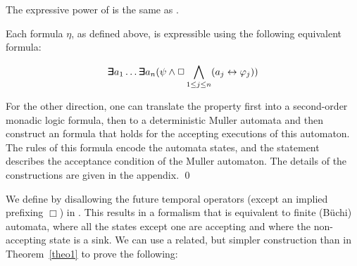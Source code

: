 \begin{theorem}
\label{theo1}
The expressive power of 
\ELTL{} is the same as \QLTL{}.
\end{theorem}
Each \ELTL{} formula $\eta$, as defined above,
is expressible using the following equivalent \QLTL{} formula:

\[   \bm{\exists}\kern-0.6em\bm{\exists} a_1 \ldots \bm{\exists}\kern-0.6em\bm{\exists} a_n  ( \psi  \wedge   \Box \bigwedge_{1 \leq j \leq n} ( a_j \leftrightarrow \varphi_j))
\]


\noindent
For the other direction, one can translate the \QLTL{} property first into
a second-order monadic logic formula, then to a deterministic Muller automata and then construct an \ELTL{} formula that holds for the accepting executions of this automaton. The rules of this formula encode the automata states, and the statement describes the acceptance condition of the Muller automaton.
The details of the
constructions are given in the appendix. \qed

We define \EPLTL{} by disallowing the future temporal operators (except an implied prefixing $\Box$) in \ELTL{}. This results in
a formalism that is equivalent to finite (B\"{u}chi) automata, where all the states except one are accepting and where the non-accepting state is a sink. 
We can use a related, but simpler construction than in Theorem~\ref{theo1} to prove the following:


